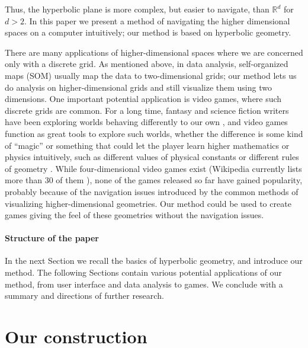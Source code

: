 \documentclass{article}
\begin{document}
Thus, the hyperbolic plane is more complex, but easier to navigate, than
$\mathbb{R}^d$ for $d>2$. 
In this paper we present a method of navigating the higher dimensional
spaces on a computer intuitively; our method is based on hyperbolic geometry.

There are many applications
of higher-dimensional spaces where we are concerned only with a discrete grid.
As mentioned above, 
in data analysis, self-organized maps (SOM) usually map the data to two-dimensional
grids; our method lets us do analysis on higher-dimensional grids and still visualize them
using two dimensions. One important potential application is video games, where such discrete grids are common.
For a long time,
fantasy and science fiction writers have been exploring worlds behaving differently
to our own \cite{flatland}, and video games function as great tools to explore such worlds,
whether the difference is some kind of ``magic'' or something that could let the
player learn higher mathematics or physics intuitively, such as different values
of physical constants \cite{slowerspeedoflight} or different rules of geometry
\cite{hyperrogue}. While four-dimensional video games exist (Wikipedia currently lists
more than 30 of them \cite{wiki4}), none of the games
released so far have gained popularity, probably because of the navigation issues
introduced by the common methods of visualizing higher-dimensional geometries.
Our method could be used to create games giving the feel of these geometries without
the navigation issues. 

\paragraph{Structure of the paper}
In the next Section we recall the basics of hyperbolic geometry, and introduce our
method. The following Sections contain various potential applications of our
method, from user interface and data analysis to games. We conclude with a summary and
directions of further research.


\section{Our construction}\label{ourcon}
\end{document}
